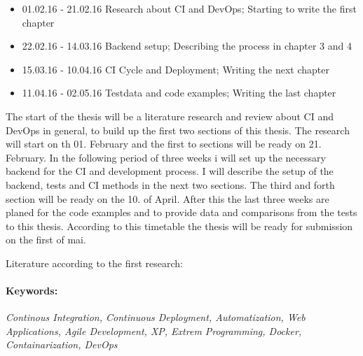 \begin{itemize}
  \item 01.02.16 - 21.02.16 Research about CI and DevOps; Starting to write the first chapter
  \item 22.02.16 - 14.03.16 Backend setup; Describing the process in chapter 3 and 4
  \item 15.03.16 - 10.04.16 CI Cycle and Deployment; Writing the next chapter
  \item 11.04.16 - 02.05.16 Testdata and code examples; Writing the last chapter
\end{itemize}

The start of the thesis will be a literature research and review about CI and DevOps in general, to build up the first two sections of this
thesis. The research will start on th 01. February and the first to sections will be ready on 21. February. In the following period
of three weeks i will set up the necessary backend for the CI and development process. I will describe the setup of the backend, tests and
CI methods in the next two sections. The third and forth section will be ready on the 10. of April. After this the last three weeks are
planed for the code examples and to provide data and comparisons from the tests to this thesis. According to this timetable the thesis will
be ready for submission on the first of mai.

Literature according to the first research:

\cite{meyer2014continuous}
\cite{schaefer2013continuous}
\cite{humble2010continuous}
\cite{fowler2006continuous}
\cite{fowler2012continuous}
\cite{duvall2007continuous}
\cite{stolberg2009enabling}
\cite{humble2010continuous}
\cite{staahl2014modeling}
\cite{maurer2002extreme}
\cite{hansen2015continuous}
\cite{pasquali2015deploying}
\cite{turnbull2014docker}
\cite{raj2015learning}
\cite{astels2003test}
\cite{beck2003test}
\cite{maximilien2003assessing}
\cite{janzen2005test}

\paragraph{Keywords:}
\textit{Continous Integration, Continuous Deployment, Automatization, Web Applications, Agile Development, XP, Extrem Programming, Docker, Containarization, DevOps }
